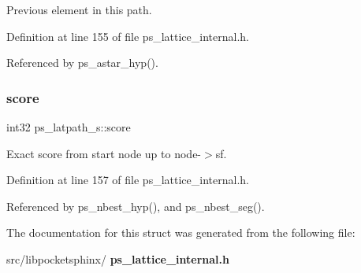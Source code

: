 Previous element in this path. 



Definition at line 155 of file ps\+\_\+lattice\+\_\+internal.\+h.



Referenced by ps\+\_\+astar\+\_\+hyp().

\mbox{\label{structps__latpath__s_a9249fb528f754db992df1d494a69b580}} 
\subsubsection{score}
{\footnotesize\ttfamily int32 ps\+\_\+latpath\+\_\+s\+::score}



Exact score from start node up to node-\/$>$sf. 



Definition at line 157 of file ps\+\_\+lattice\+\_\+internal.\+h.



Referenced by ps\+\_\+nbest\+\_\+hyp(), and ps\+\_\+nbest\+\_\+seg().



The documentation for this struct was generated from the following file\+:\begin{DoxyCompactItemize}
\item 
src/libpocketsphinx/\textbf{ ps\+\_\+lattice\+\_\+internal.\+h}\end{DoxyCompactItemize}
